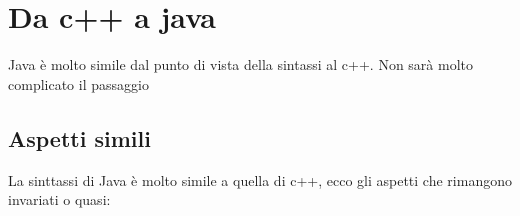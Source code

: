 \newpage
\renewcommand{\arraystretch}{1.5}
\section{Da c++ a java}
Java è molto simile dal punto di vista della sintassi al c++. Non sarà molto complicato il passaggio
\subsection{Aspetti simili}
La sinttassi di Java è molto simile a quella di c++, ecco gli aspetti che rimangono invariati o quasi:

